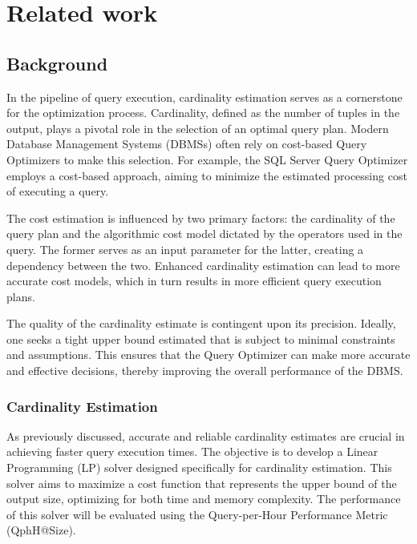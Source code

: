 
\chapter{Related work}\label{chapter:relatedwork}

\section{Background}
In the pipeline of query execution, cardinality estimation serves 
as a cornerstone for the optimization process. 
Cardinality, defined as the number of tuples in the output, 
plays a pivotal role in the selection of an optimal query plan. 
Modern Database Management Systems (DBMSs) often rely on 
cost-based Query Optimizers to make this selection. 
For example, the SQL Server Query Optimizer
 \parencite{microsoft2023cardinality} employs a 
 cost-based approach, aiming to minimize the estimated 
 processing cost of executing a query.

The cost estimation is influenced by two primary factors: 
the cardinality of the query plan and the algorithmic cost 
model dictated by the operators used in the query. The 
former serves as an input parameter for the latter, creating 
a dependency between the two. Enhanced cardinality estimation 
can lead to more accurate cost models, which in turn results 
in more efficient query execution plans.

The quality of the cardinality estimate is contingent 
upon its precision. Ideally, one seeks a tight upper bound estimated
 that is subject to minimal constraints and assumptions.
  This ensures that the Query Optimizer can make more accurate 
  and effective decisions, thereby improving the overall 
  performance of the DBMS.

\subsection{Cardinality Estimation}
As previously discussed, accurate and 
reliable cardinality estimates are crucial 
in achieving faster query execution times. 
The objective is to develop a Linear Programming (LP) 
solver designed specifically for cardinality estimation. 
This solver aims to maximize a cost function that represents 
the upper bound of the output size, optimizing for both 
time and memory complexity. The performance of this solver 
will be evaluated using the Query-per-Hour Performance Metric 
(QphH@Size).

